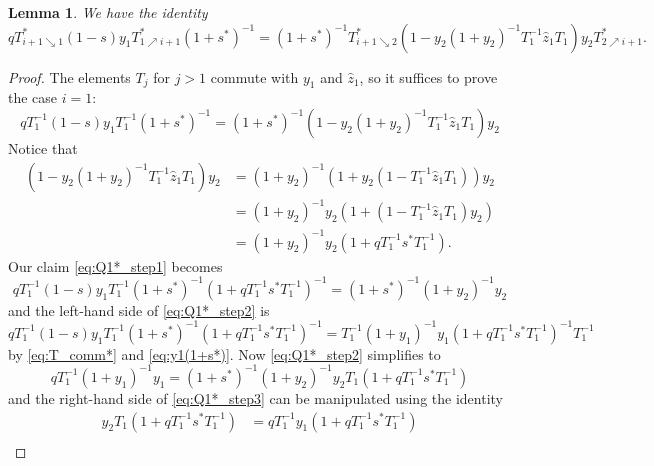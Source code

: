 \documentclass[reqno]{amsart}
\theoremstyle{plain}
\newtheorem{lemma}[theorem]{Lemma}
\theoremstyle{definition}
\theoremstyle{remark}
\newcommand{\z}{\widehat{z}}
\newcommand{\<}{\langle}
\renewcommand{\>}{\rangle}
\begin{document}
\begin{lemma} 
    \label{lemma:proof_Q1*}
    We have the identity
    \[ qT^*_{i+1 \searrow 1} (1-s) y_1 T^*_{1 \nearrow i+1} (1+s^*)^{-1} = (1+s^*)^{-1} T^*_{i+1 \searrow 2} \left( 1 - y_2 (1 + y_2)^{-1} T_1^{-1} \z_1 T_1 \right) y_2 T^*_{2 \nearrow i+1}.\]
\end{lemma}

\begin{proof}
    The elements $T_j$ for $j>1$ commute with $y_1$ and $\z_1$, so it suffices to prove the case $i=1$:
    \begin{equation}
        \label{eq:Q1*_step1}
        qT^{-1}_1 (1-s) y_1 T^{-1}_1 (1+s^*)^{-1} = (1+s^*)^{-1}  \left(1 - y_2 (1 + y_2)^{-1} T_1^{-1} \z_1 T_1 \right) y_2
    \end{equation} 
    Notice that
    \begin{align*}
        \left( 1 - y_2 (1 + y_2)^{-1} T_1^{-1} \z_1 T_1 \right) y_2 
        &= (1 + y_2)^{-1} \left( 1 + y_2 \left( 1 - T_1^{-1} \z_1 T_1 \right) \right)  y_2 \\
        &= (1 + y_2)^{-1} y_2 \left( 1 + \left( 1 - T_1^{-1} \z_1 T_1 \right) y_2 \right)  \\
        &= (1 + y_2)^{-1} y_2 \left( 1 + qT_1^{-1} s^* T_1^{-1} \right). 
    \end{align*}
    Our claim \eqref{eq:Q1*_step1} becomes
    \begin{equation}
        \label{eq:Q1*_step2}
        qT^{-1}_1 (1-s) y_1 T^{-1}_1 (1+s^*)^{-1} \left( 1 + qT_1^{-1} s^* T_1^{-1} \right)^{-1} = (1+s^*)^{-1}  (1 + y_2)^{-1} y_2
    \end{equation} 
    and the left-hand side of \eqref{eq:Q1*_step2} is
    \[ qT^{-1}_1 (1-s) y_1 T^{-1}_1 (1+s^*)^{-1} \left( 1 + qT_1^{-1} s^* T_1^{-1} \right)^{-1} = T_1^{-1} (1 + y_1)^{-1} y_1 \left( 1 + qT_1^{-1} s^* T_1^{-1} \right)^{-1} T^{-1}_1 \]
    by \eqref{eq:T_comm*} and \eqref{eq:y1(1+s*)}.
    Now \eqref{eq:Q1*_step2} simplifies to
    \begin{equation}
        \label{eq:Q1*_step3}
        qT_1^{-1} (1 + y_1)^{-1} y_1 = (1+s^*)^{-1} (1 + y_2)^{-1} y_2 T_1 \left( 1 + qT_1^{-1} s^* T_1^{-1} \right)
    \end{equation}
    and the right-hand side of \eqref{eq:Q1*_step3} can be manipulated using the identity
    \begin{align*}
        y_2 T_1 \left( 1 + qT_1^{-1} s^* T_1^{-1} \right)
        & = q T_1^{-1} y_1 \left( 1 + qT_1^{-1} s^* T_1^{-1} \right) \\

\end{align*}
\end{proof}
\end{document}
